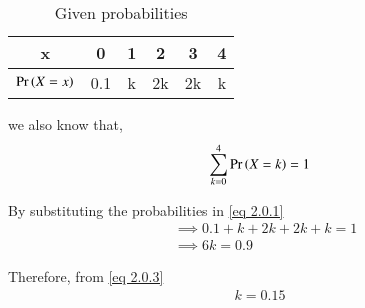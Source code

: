 \documentclass[journal,12pt,twocolumn]{IEEEtran}
\begin{document}
  \begin{table}[ht]
  
 \centering
  
  \begin{tabular}{|c|c|c|c|c|c|}
    \hline
    x &  0 & 1 & 2 & 3 & 4\\
    \hline
    $\Pr\left(X=x\right)$ & 0.1& k& 2k & 2k & k\\
    \hline
    
\end{tabular}
\caption{Given probabilities}
\label{Table_1}
\end{table}
we also know that,
\begin{align}
    \sum_{k = 0}^4 \Pr\left(X = k\right) = 1 \label{eq 2.0.1}
\end{align}

By substituting the probabilities in \eqref{eq 2.0.1}
\begin{align}
& \implies 0.1 + k + 2k + 2k + k = 1 \\
& \implies 6k = 0.9 \label{eq 2.0.3}
\end{align}

Therefore, from \eqref{eq 2.0.3}
\begin{align}
    k = 0.15
\end{align}
  
\end{document}
